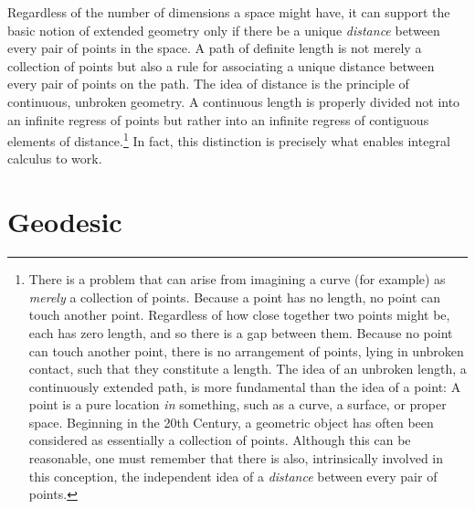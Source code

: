 \documentclass[twocolumn,10pt]{book}
\begin{document}
Regardless of the number of dimensions a space might have, it can support the
basic notion of extended geometry only if there be a unique \emph{distance}
between every pair of points in the space.  A path of definite length is not
merely a collection of points but also a rule for associating a unique distance
between every pair of points on the path.  The idea of distance is the
principle of continuous, unbroken geometry.
A continuous length is properly divided not into an infinite regress of points
but rather into an infinite regress of contiguous elements of
distance.\footnote{%
   There is a problem that can arise from imagining a curve (for example) as
   \emph{merely} a collection of points.  Because a point has no length, no
   point can touch another point.  Regardless of how close together two points
   might be, each has zero length, and so there is a gap between them.  Because
   no point can touch another point, there is no arrangement of points, lying
   in unbroken contact, such that they constitute a length.  The idea of an
   unbroken length, a continuously extended path, is more fundamental than the
   idea of a point:  A point is a pure location \emph{in} something, such as a
   curve, a surface, or proper space.  Beginning in the 20th Century, a
   geometric object has often been considered as essentially a collection of
   points.  Although this can be reasonable, one must remember that there is
   also, intrinsically involved in this conception, the independent idea of a
   \emph{distance} between every pair of points.%
}
In fact, this distinction is precisely what enables integral calculus to work.

\section{Geodesic}

\appendix

\backmatter



\onecolumn




\printindex
\end{document}
